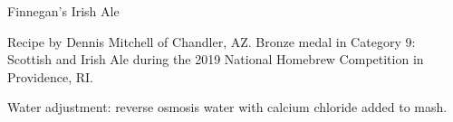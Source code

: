 \begin{recipe}{Finnegan's Irish Ale}

\begin{aboutblock}
Recipe by Dennis Mitchell of Chandler, AZ. Bronze medal in Category 9: Scottish
and Irish Ale during the 2019 National Homebrew Competition in Providence, RI.
\sourceaha
\end{aboutblock}


\begin{methodandtiming}
 
\begin{mashsteps}
\end{mashsteps}

\begin{fermentationsteps}
\end{fermentationsteps}

\begin{directions}
Water adjustment: reverse osmosis water with  calcium chloride added to
mash.
\end{directions}

\end{methodandtiming}

\recipebreak

\begin{ingredientsblock}

\begin{malts}
\end{malts}

\begin{hops}
\end{hops}


\end{ingredientsblock}

\end{recipe}

